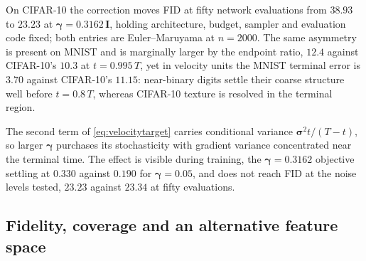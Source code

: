 On CIFAR-10 the correction moves FID at fifty network evaluations from $38.93$ to
$23.23$ at $\boldsymbol{\gamma}=0.3162\,\boldsymbol{I}$, holding architecture,
budget, sampler and evaluation code fixed; both entries are Euler--Maruyama at
$n=2000$. The same asymmetry is present on MNIST and is
marginally larger by the endpoint ratio, $12.4$ against CIFAR-10's $10.3$ at
$t=0.995\,T$, yet in velocity units the MNIST terminal error is $3.70$ against
CIFAR-10's $11.15$: near-binary digits settle their coarse structure well before
$t=0.8\,T$, whereas CIFAR-10 texture is resolved in the terminal region.

The second term of \eqref{eq:velocitytarget} carries conditional variance
$\boldsymbol{\sigma}^2 t/(T-t)$, so larger $\boldsymbol{\gamma}$ purchases its
stochasticity with gradient variance concentrated near the terminal time. The
effect is visible during training, the $\boldsymbol{\gamma}=0.3162$ objective
settling at $0.330$ against $0.190$ for $\boldsymbol{\gamma}=0.05$, and does not
reach FID at the noise levels tested, $23.23$ against $23.34$ at fifty
evaluations.

\clearpage
\subsection{Fidelity, coverage and an alternative feature space}
\label{app:coverage}


